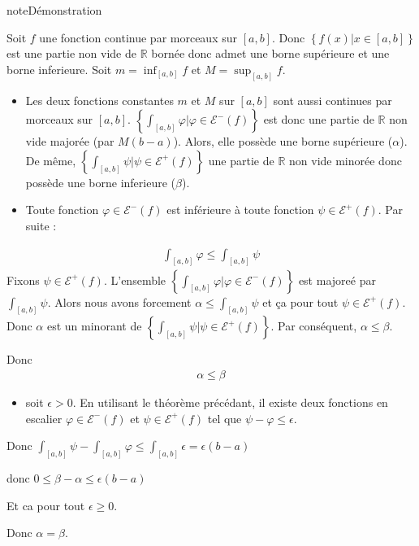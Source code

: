 \documentclass[letterpaper,10pt,french]{sphinxmanual}
\begin{document}
\begin{sphinxadmonition}{note}{Démonstration}

\sphinxAtStartPar
Soit \(f\) une fonction continue par morceaux sur \([a, b]\). Donc \(\left\{f(x)|x\in [a, b]\right\}\) est une partie non vide de \(\mathbb R\) bornée donc admet une borne supérieure et une borne inferieure. Soit \(m=\inf_{[a, b]} f\) et \(M=\sup_{[a, b]} f\).
\begin{itemize}
\item {} 
\sphinxAtStartPar
Les deux fonctions constantes \(m\) et \(M\) sur \([a, b]\) sont aussi continues par morceaux sur \([a, b]\). \(\left\{\int_{[a, b]} \varphi | \varphi \in \mathcal{E}^-(f)\right\}\) est donc une partie de \(\mathbb R\) non vide majorée (par \(M(b-a)\)). Alors, elle possède une borne supérieure (\(\alpha\)). De même, \(\left\{\int_{[a, b]} \psi | \psi \in \mathcal{E}^+(f)\right\}\) une partie de \(\mathbb R\) non vide minorée donc possède une borne inferieure (\(\beta\)).

\item {} 
\sphinxAtStartPar
Toute fonction \(\varphi \in \mathcal{E}^-(f)\) est inférieure à toute fonction \(\psi \in \mathcal{E}^+(f)\). Par suite :

\end{itemize}
\begin{equation*}
\begin{split}
\int_{[a, b]} \varphi \leq \int_{[a, b]} \psi
\end{split}
\end{equation*}
\sphinxAtStartPar
Fixons \(\psi \in \mathcal{E}^+(f)\). L’ensemble \(\left\{\int_{[a, b]} \varphi | \varphi \in \mathcal{E}^-(f)\right\}\) est majoreé par \(\int_{[a, b]} \psi\). Alors nous avons forcement \(\alpha \leq \int_{[a, b]} \psi\) et ça pour tout \(\psi \in \mathcal{E}^+(f)\). Donc \(\alpha\) est un minorant de \(\left\{\int_{[a, b]} \psi | \psi \in \mathcal{E}^+(f)\right\}\). Par conséquent, \(\alpha \leq \beta\).

\sphinxAtStartPar
Donc
\begin{equation*}
\begin{split}
\alpha \leq \beta
\end{split}
\end{equation*}\begin{itemize}
\item {} 
\sphinxAtStartPar
soit \(\epsilon >0\). En utilisant le théorème précédant, il existe deux fonctions en escalier \(\varphi \in \mathcal{E}^-(f)\) et \(\psi \in \mathcal{E}^+(f)\)  tel que \(\psi - \varphi \leq \epsilon\).

\end{itemize}

\sphinxAtStartPar
Donc \(\int_{[a, b]} \psi - \int_{[a, b]} \varphi \leq \int_{[a, b]} \epsilon = \epsilon(b-a)\)

\sphinxAtStartPar
donc \(0 \leq \beta - \alpha \leq \epsilon(b-a)\)

\sphinxAtStartPar
Et ca pour tout \(\epsilon \geq 0\).

\sphinxAtStartPar
Donc \(\alpha = \beta\).
\end{sphinxadmonition}
\end{document}
